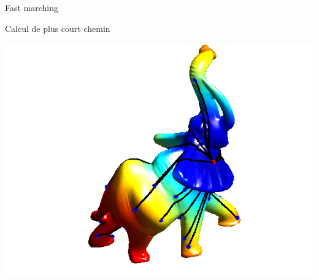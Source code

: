 \begin{frame}{Fast marching}
\begin{block}{Calcul de plus court chemin}
\begin{minipage}{0.45\linewidth}
\includegraphics[width=\linewidth]{images/content_08.png}
\end{minipage}
\end{block}

\end{frame}

